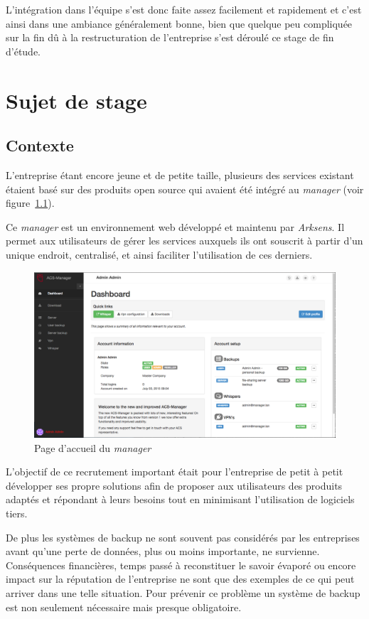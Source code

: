 \documentclass[a4paper,10pt, twoside]{report}
\begin{document}
\begin{spacing}{1.2}
L'int\'egration dans l'\'equipe s'est donc faite assez facilement et rapidement
et c'est ainsi dans une ambiance g\'en\'eralement bonne, bien que quelque peu
compliqu\'ee sur la fin d\^u \`a la restructuration de l'entreprise s'est
d\'eroul\'e ce stage de fin d'\'etude.

\chapter{Sujet de stage}
\thispagestyle{fancy}
\section{Contexte}
L'entreprise \'etant encore jeune et de petite taille, plusieurs des services
existant \'etaient bas\'e sur des produits open source qui avaient \'et\'e
int\'egr\'e au \textit{manager} (voir figure~\ref{managerFront}).

Ce \textit{manager} est un environnement web d\'evelopp\'e et maintenu par
\textit{Arksens}. Il permet aux utilisateurs de g\'erer les services auxquels
ils ont souscrit \`a partir d'un unique endroit, centralis\'e, et ainsi
faciliter l'utilisation de ces derniers.

\begin{figure}[h!]
  \centering
  \includegraphics[width=15cm]{produits/manager.png}
  \caption{\label{managerFront} Page d'accueil du \textit{manager}}
\end{figure}

L'objectif de ce recrutement important \'etait pour l'entreprise de petit \`a
petit d\'evelopper ses propre solutions afin de proposer aux utilisateurs des
produits adapt\'es et r\'epondant \`a leurs besoins tout en minimisant
l'utilisation de logiciels tiers.

De plus les syst\`emes de backup ne sont souvent pas consid\'er\'es par les
entreprises avant qu'une perte de donn\'ees, plus ou moins importante,
ne survienne. Cons\'equences financi\`eres, temps pass\'e \`a reconstituer le
savoir \'evapor\'e ou encore impact sur la r\'eputation de l'entreprise ne sont
que des exemples de ce qui peut arriver dans une telle situation. Pour
pr\'evenir ce probl\`eme un syst\`eme de backup est non seulement n\'ecessaire
mais presque obligatoire.


\end{spacing}
\end{document}
